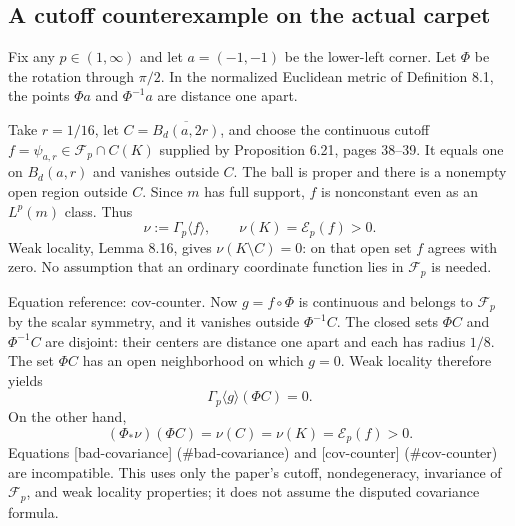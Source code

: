 \documentclass[10pt]{article}
\begin{document}
\subsection*{A cutoff counterexample on the actual carpet}
Fix any \(p\in(1,\infty)\) and let \(a=(-1,-1)\) be the lower-left corner. Let \(\Phi\) be the rotation through \(\pi/2\). In the normalized Euclidean metric of Definition 8.1, the points \(\Phi a\) and \(\Phi^{-1}a\) are distance one apart.\par
Take \(r=1/16\), let \(C=\overline{B_d(a,2r)}\), and choose the continuous cutoff \(f=\psi_{a,r}\in\mathcal F_p\cap C(K)\) supplied by Proposition 6.21, pages 38–39. It equals one on \(B_d(a,r)\) and vanishes outside \(C\). The ball is proper and there is a nonempty open region outside \(C\). Since \(m\) has full support, \(f\) is nonconstant even as an \(L^p(m)\) class. Thus \[\nu:=\Gamma_p\langle f\rangle,\qquad \nu(K)=\mathcal E_p(f)>0.\] Weak locality, Lemma 8.16, gives \(\nu(K\setminus C)=0\): on that open set \(f\) agrees with zero. No assumption that an ordinary coordinate function lies in \(\mathcal F_p\) is needed.\par
Equation reference: cov-counter. Now \(g=f\circ\Phi\) is continuous and belongs to \(\mathcal F_p\) by the scalar symmetry, and it vanishes outside \(\Phi^{-1}C\). The closed sets \(\Phi C\) and \(\Phi^{-1}C\) are disjoint: their centers are distance one apart and each has radius \(1/8\). The set \(\Phi C\) has an open neighborhood on which \(g=0\). Weak locality therefore yields \[\Gamma_p\langle g\rangle(\Phi C)=0.\] On the other hand, \[
 (\Phi_*\nu)(\Phi C)=\nu(C)=\nu(K)=\mathcal E_p(f)>0.\] Equations [bad-covariance] (\#bad-covariance) and [cov-counter] (\#cov-counter) are incompatible. This uses only the paper’s cutoff, nondegeneracy, invariance of \(\mathcal F_p\), and weak locality properties; it does not assume the disputed covariance formula.\par
\end{document}

